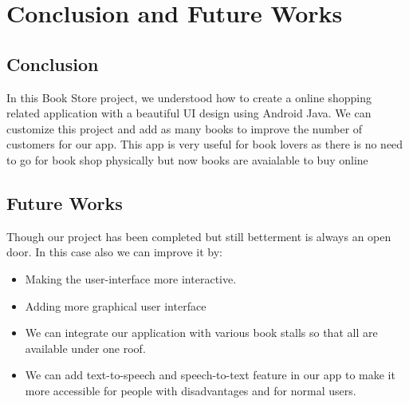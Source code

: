 \chapter{Conclusion and Future Works}

\section{Conclusion}
In this Book Store project, we understood how to create a online shopping related application
with a beautiful UI design using Android Java. We can customize this project and add as many
books to improve the number of customers for our app. This app is very useful for book lovers
as there is no need to go for book shop physically but now books are avaialable to buy online


\section{Future Works}
Though our project has been completed but still betterment is always an open door. In this
case also we can improve it by: 

\begin{itemize}
\item Making the user-interface more interactive. 
\item Adding more graphical user interface
\item We can integrate our application with various book stalls so that all are available under one roof.
\item We can add text-to-speech and speech-to-text feature in our app to make it more accessible for people with disadvantages and for normal users. 
\end{itemize}
